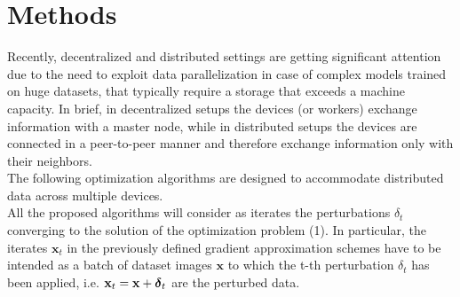 \section{Methods}
Recently, decentralized and distributed settings are getting significant attention due to the need to exploit data
parallelization in case of complex models trained on huge datasets, that typically require a storage that exceeds
a machine capacity. In brief, in decentralized setups the devices (or workers) exchange information with a master node, while in distributed setups the devices are connected in a peer-to-peer manner and therefore exchange information only with their neighbors. \\
The following optimization algorithms are designed to accommodate distributed data across multiple devices.\\
All the proposed algorithms will consider as iterates the perturbations \mbox{\boldmath$ \delta$}$_t$ converging to the solution of the optimization problem (1). In particular, the iterates $\mathbf{x}_t$ in the previously defined gradient approximation schemes have to be intended as a batch of dataset images $\mathbf{x}$ to which the t-th perturbation \mbox{\boldmath$ \delta$}$_t$ has been applied, i.e. $\mathbf{x}_t = \mathbf{x} + \mbox{\boldmath$ \delta$}_t$ are the perturbed data.